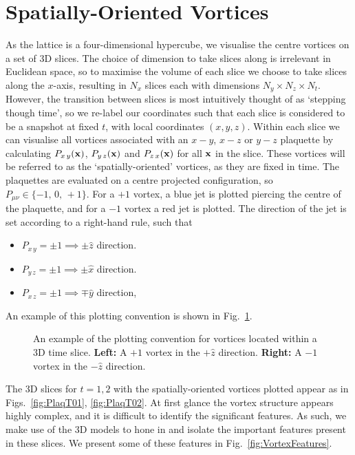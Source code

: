 \section{Spatially-Oriented Vortices}
As the lattice is a four-dimensional hypercube, we visualise the centre vortices on a set of 3D slices. The choice of dimension to take slices along is irrelevant in Euclidean space, so to maximise the volume of each slice we choose to take slices along the $x$-axis, resulting in $N_x$ slices each with dimensions $N_y\times N_z\times N_t$. However, the transition between slices is most intuitively thought of as `stepping though time', so we re-label our coordinates such that each slice is considered to be a snapshot at fixed $t$, with local coordinates $(x,y,z)$. Within each slice we can visualise all vortices associated with an $x-y$, $x-z$ or $y-z$ plaquette by calculating $P_{x\,y}(\bf{x})$, $P_{y\,z}(\bf{x})$ and $P_{z\,x}(\bf{x})$ for all $\bf{x}$ in the slice. These vortices will be referred to as the `spatially-oriented' vortices, as they are fixed in time. The plaquettes are evaluated on a centre projected configuration, so $P_{\mu\nu}\in \lbrace -1,\,0,\,+1\rbrace$. For a $+1$ vortex, a blue jet is plotted piercing the centre of the plaquette, and for a $-1$ vortex a red jet is plotted. The direction of the jet is set according to a right-hand rule, such that
\begin{itemize}[leftmargin=*,itemsep=0pt,labelsep=12pt]
\item $P_{x\,y}=\pm 1\implies \pm\hat{z}$ direction.
\item $P_{y\,z}=\pm 1\implies \pm\hat{x}$ direction.
\item $P_{x\,z}=\pm 1\implies \mp\hat{y}$ direction,
\end{itemize}
An example of this plotting convention is shown in Fig.~\ref{fig:SpacialVortices}.\\
%
\begin{figure}[ht]
\centering
\scalebox{1}{}     
\caption[An example of the plotting convention for vortices located within a 3D time slice.]{\label{fig:SpacialVortices}An example of the plotting convention for vortices located within a 3D time slice. \textbf{Left:} A $+1$ vortex in the $+\hat{z}$ direction. \textbf{Right:} A $-1$ vortex in the $-\hat{z}$ direction.}
\end{figure}
%
\clearpage
The 3D slices for $t=1,2$ with the spatially-oriented vortices plotted appear as in Figs.~\ref{fig:PlaqT01}, \ref{fig:PlaqT02}. At first glance the vortex structure appears highly complex, and it is difficult to identify the significant features. As such, we make use of the 3D models to hone in and isolate the important features present in these slices. We present some of these features in Fig.~\ref{fig:VortexFeatures}.\\
